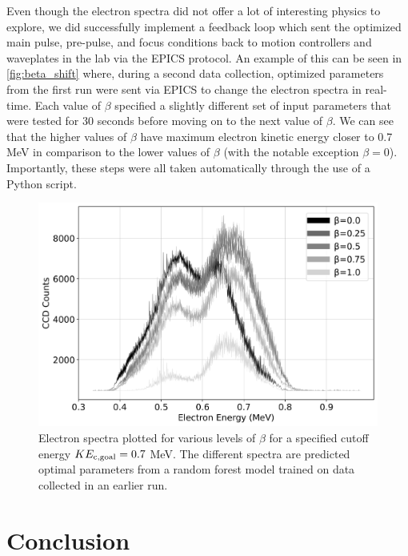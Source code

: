 Even though the electron spectra did not offer a lot of interesting physics to explore, we did successfully implement a feedback loop which sent the optimized main pulse, pre-pulse, and focus conditions back to motion controllers and waveplates in the lab via the \gls{EPICS} protocol. An example of this can be seen in \autoref{fig:beta_shift} where, during a second data collection, optimized parameters from the first run were sent via \gls{EPICS} to change the electron spectra in real-time. Each value of $\beta$ specified a slightly different set of input parameters that were tested for 30 seconds before moving on to the next value of $\beta$. We can see that the higher values of $\beta$ have maximum electron kinetic energy closer to 0.7 MeV in comparison to the lower values of $\beta$ (with the notable exception $\beta=0$). Importantly, these steps were all taken automatically through the use of a Python script.

\begin{figure}
	\centering 
	\includegraphics[width=0.6\linewidth]{planning/images/daq/rf_beta_shift.jpg}
	\caption{Electron spectra plotted for various levels of $\beta$ for a specified cutoff energy $KE_{\rm c,goal} = 0.7$ MeV. The different spectra are predicted optimal parameters from a random forest model trained on data collected in an earlier run.}
	\label{fig:beta_shift}
\end{figure}

\section{Conclusion}

